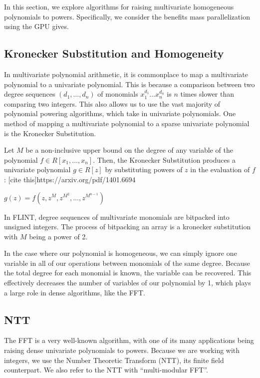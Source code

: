 In this section, we explore algorithms for raising multivariate homogeneous polynomials to powers. Specifically, we consider the benefits mass parallelization using the GPU gives.

\subsection{Kronecker Substitution and Homogeneity}
In multivariate polynomial arithmetic, it is commonplace to map a multivariate polynomial to a univariate 
polynomial. This is because a comparison between two degree sequences $(d_1, \dots , d_n)$ of monomials 
$x_1^{d_1} \dots x_n^{d_n}$ is $n$ times slower than comparing two integers. This also allows us to use the vast majority of polynomial powering algorithms, which take in univariate polynomials. One method of mapping a multivariate polynomial to a sparse univariate polynomial is the Kronecker Substitution.

\begin{defn}
    Let $M$ be a non-inclusive upper bound on the degree of any variable of the polynomial
    $f \in R[x_1, \dots, x_n]$. Then, the Kronecker Substitution produces a univariate polynomial $g \in R[z]$ by substituting powers of $z$ in 
    the evaluation of $f$: [cite this]{https://arxiv.org/pdf/1401.6694}

    \begin{center}
        $g(z) = f(z, z^M, z^{M^2}, \dots, z^{M^{n-1}})$
    \end{center}
\end{defn}

\begin{rmk}
    In FLINT, degree sequences of multivariate monomials are bitpacked into unsigned integers. The process of bitpacking an array is a kronecker substitution with $M$ being a power of 2.
\end{rmk}

In the case where our polynomial is homogeneous, we can simply ignore one variable in all of our operations between monomials of the same degree. Because the total degree for each monomial is known, the variable can be recovered. This effectively decreases the number of variables of our polynomial by 1, which plays a large role in dense algorithms, like the FFT.

\subsection{NTT}
The FFT is a very well-known algorithm, with one of its many applications being raising dense univariate polynomials to powers.
Because we are working with integers, we use the Number Theoretic Transform (NTT), its finite field counterpart. We also refer to the NTT with ``multi-modular FFT''.

